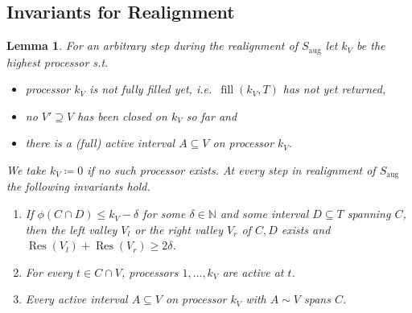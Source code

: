 \documentclass[a4paper]{article}
\DeclareMathOperator{\aug}{aug}
\DeclareMathOperator{\fillop}{fill}
\DeclareMathOperator{\res}{Res}
\newtheorem{lemma}[theorem]{Lemma}
\begin{document}
\subsection{Invariants for Realignment}
\begin{lemma}\label{lemma:invariant}
  For an arbitrary step during the realignment of $S_{\aug}$ let $k_V$ be the highest processor s.t.\
  \begin{itemize}
    \item
      processor $k_V$ is not fully filled yet, i.e.\ $\fillop(k_V, T)$ has not yet returned,
    \item
      no $V' \supseteq V$ has been closed on $k_V$ so far and
    \item
      there is a (full) active interval $A \subseteq V$ on processor $k_V$.
  \end{itemize}
  We take $k_V \coloneqq 0$ if no such processor exists.
  At every step in realignment of $S_{\aug}$ the following invariants hold.
  \begin{enumerate}
    \item
      If $\phi(C \cap D) \leq k_V - \delta$ for some $\delta \in \mathbb{N}$ and some interval $D \subseteq T$ spanning $C$, then the left valley $V_l$ or the right valley $V_r$ of $C, D$ exists and $\res(V_l) + \res(V_r) \geq 2 \delta$.
    \item
      For every $t \in C \cap V$, processors $1, \ldots, k_V$ are active at $t$.
    \item
      Every active interval $A \subseteq V$ on processor $k_V$ with $A \sim V$ spans $C$.
  \end{enumerate}
\end{lemma}
\end{document}
